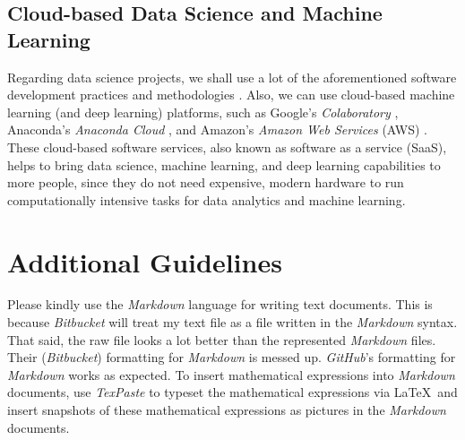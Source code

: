 \documentclass[letter,12pt]{article}
\begin{document}
\subsection{Cloud-based Data Science and Machine Learning}
\label{ssec:CloudBasedDataScienceAndMachineLearning}

Regarding data science projects, we shall use a lot of the aforementioned software development practices and methodologies \cite{Cady2017}. Also, we can use cloud-based machine learning (and deep learning) platforms, such as Google's {\it Colaboratory} \cite{GoogleAIStaff2019}, Anaconda's {\it Anaconda Cloud} \cite{AnacondaStaff2019}, and Amazon's {\it Amazon Web Services} (AWS) \cite{AmazonWebServicesStaff2019}. These cloud-based software services, also known as software as a service (SaaS), helps to bring data science, machine learning, and deep learning capabilities to more people, since they do not need expensive, modern hardware to run computationally intensive tasks for data analytics and machine learning.








\section{Additional Guidelines}
\label{sec:AdditionalGuidelines}

Please kindly use the {\it Markdown} language for writing text documents. This is because {\it Bitbucket} will treat my text file as a file written in the {\it Markdown} syntax. That said, the raw file looks a lot better than the represented {\it Markdown} files. Their ({\it Bitbucket}) formatting for {\it Markdown} is messed up. {\it GitHub}'s formatting for {\it Markdown} works as expected. To insert mathematical expressions into {\it Markdown} documents, use {\it TexPaste} \cite{Nguyen2013} to typeset the mathematical expressions via \LaTeX\ and insert snapshots of these mathematical expressions as pictures in the {\it Markdown} documents. \\
\end{document}
